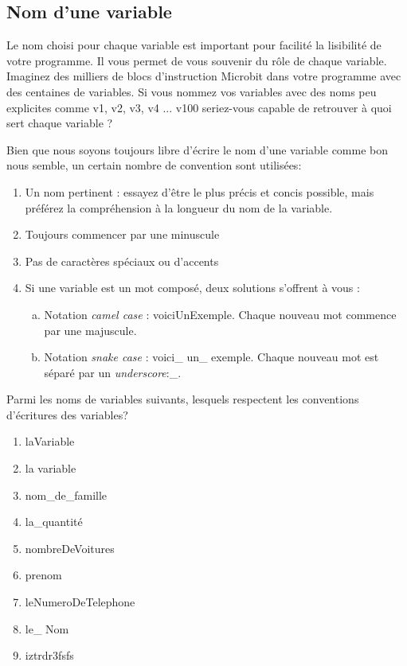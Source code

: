\documentclass[11pt, a4paper]{book}
\begin{document}
\subsection{Nom d'une variable}
Le nom choisi pour chaque variable est important pour facilité la lisibilité de votre programme. Il vous permet de vous souvenir du rôle de chaque variable. Imaginez des milliers de blocs d'instruction Microbit dans votre programme avec des centaines de variables. Si vous nommez vos variables avec des noms peu explicites comme v1, v2, v3, v4 ... v100 seriez-vous capable de retrouver à quoi sert chaque variable ?

Bien que nous soyons toujours libre d'écrire le nom d'une variable comme bon nous semble, un certain nombre de convention sont utilisées:
\begin{enumerate}[1)]
\item Un nom pertinent : essayez d'être le plus précis et concis possible, mais préférez la compréhension à la longueur du nom de la variable. 
\item Toujours commencer par une minuscule
\item Pas de caractères spéciaux ou d'accents
\item Si une variable est un mot composé, deux solutions s'offrent à vous :
\begin{enumerate}[a)] 
\item Notation {\it camel case} : voiciUnExemple. Chaque nouveau mot commence par une majuscule.
\item  Notation {\it snake case} : voici\_ un\_ exemple. Chaque nouveau mot est séparé par un {\it underscore}:\_.

\end{enumerate}
\end{enumerate}

\begin{exercice}
Parmi les noms de variables suivants, lesquels respectent les conventions d'écritures des variables?
\begin{enumerate}
\item laVariable
\item la variable
\item nom\_de\_famille
\item la\_quantité
\item nombreDeVoitures
\item prenom
\item leNumeroDeTelephone
\item le\_ Nom
\item iztrdr3fsfs

\end{enumerate}
\end{exercice}
\end{document}
